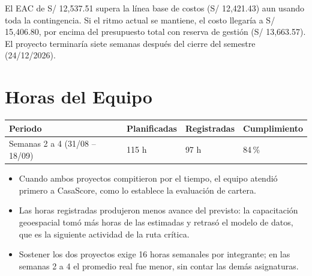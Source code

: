 \documentclass[11pt,a4paper]{article}
\begin{document}
\vspace{0.1cm}
\noindent El EAC de S/ 12,537.51 supera la línea base de costos (S/ 12,421.43) aun usando toda la contingencia. Si el ritmo actual se mantiene, el costo llegaría a S/ 15,406.80, por encima del presupuesto total con reserva de gestión (S/ 13,663.57). El proyecto terminaría siete semanas después del cierre del semestre (24/12/2026).

\section{Horas del Equipo}
{\small
{}
\noindent\begin{tabularx}{\textwidth}{@{}L Q{2.5cm} Q{2.5cm} Q{2.5cm}@{}}
\toprule
{}
\textbf{Periodo} & \textbf{Planificadas} & \textbf{Registradas} & \textbf{Cumplimiento} \\
\midrule
Semanas 2 a 4 (31/08 -- 18/09) & 115 h & 97 h & 84\,\% \\
\bottomrule
\end{tabularx}
}

\vspace{0.1cm}
\begin{itemize}[leftmargin=*]
    \item Cuando ambos proyectos compitieron por el tiempo, el equipo atendió primero a CasaScore, como lo establece la evaluación de cartera.
    \item Las horas registradas produjeron menos avance del previsto: la capacitación geoespacial tomó más horas de las estimadas y retrasó el modelo de datos, que es la siguiente actividad de la ruta crítica.
    \item Sostener los dos proyectos exige 16 horas semanales por integrante; en las semanas 2 a 4 el promedio real fue menor, sin contar las demás asignaturas.
\end{itemize}

\end{document}
